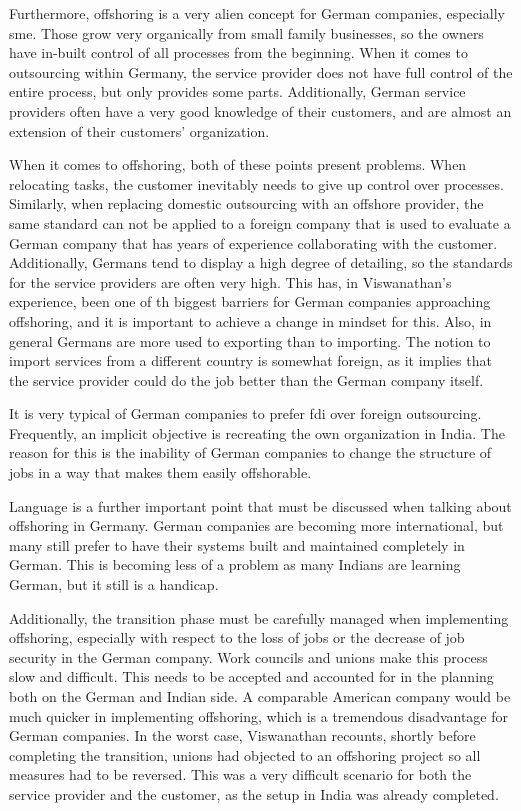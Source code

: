 Furthermore, offshoring is a very alien concept for German companies, especially \gls{sme}. Those grow very organically from small family businesses, so the owners have in-built control of all processes from the beginning. When it comes to outsourcing within Germany, the service provider does not have full control of the entire process, but only provides some parts. Additionally, German service providers often have a very good knowledge of their customers, and are almost an extension of their customers' organization. 

When it comes to offshoring, both of these points present problems. When relocating tasks, the customer inevitably needs to give up control over processes. Similarly, when replacing domestic outsourcing with an offshore provider, the same standard can not be applied to a foreign company that is used to evaluate a German company that has years of experience collaborating with the customer. Additionally, Germans tend to display a high degree of detailing, so the standards for the service providers are often very high. This has, in Viswanathan's experience, been one of th biggest barriers for German companies approaching offshoring, and it is important to achieve a change in mindset for this. Also, in general Germans are more used to exporting than to importing. The notion to import services from a different country is somewhat foreign, as it implies that the service provider could do the job better than the German company itself.

It is very typical of German companies to prefer \gls{fdi} over foreign outsourcing. Frequently, an implicit objective is recreating the own organization in India. The reason for this is the inability of German companies to change the structure of jobs in a way that makes them easily offshorable.

Language is a further important point that must be discussed when talking about offshoring in Germany. German companies are becoming more international, but many still prefer to have their systems built and maintained completely in German. This is becoming less of a problem as many Indians are learning German, but it still is a handicap.

Additionally, the transition phase must be carefully managed when implementing offshoring, especially with respect to the loss of jobs or the decrease of job security in the German company. Work councils and unions make this process slow and difficult. This needs to be accepted and accounted for in the planning both on the German and Indian side. A comparable American company would be much quicker in implementing offshoring, which is a tremendous disadvantage for German companies. In the worst case, Viswanathan recounts, shortly before completing the transition, unions had objected to an offshoring project so all measures had to be reversed. This was a very difficult scenario for both the service provider and the customer, as the setup in India was already completed.

